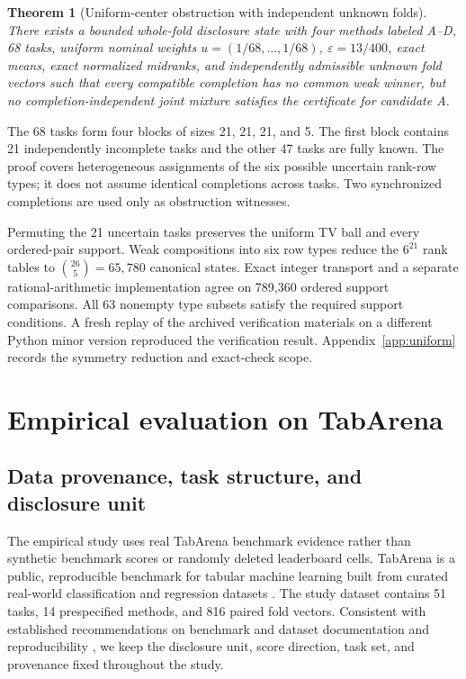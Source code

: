 \documentclass[preprint,11pt]{elsarticle}
\newtheorem{theorem}{Theorem}
\begin{document}
\begin{theorem}[Uniform-center obstruction with independent unknown folds]\label{thm:uniform}
There exists a bounded whole-fold disclosure state with four methods labeled A--D, 68 tasks, uniform nominal weights $u=(1/68,\ldots,1/68)$, $\varepsilon=13/400$, exact means, exact normalized midranks, and independently admissible unknown fold vectors such that every compatible completion has no common weak winner, but no completion-independent joint mixture satisfies the certificate for candidate A.
\end{theorem}

The 68 tasks form four blocks of sizes 21, 21, 21, and 5. The first block contains 21 independently incomplete tasks and the other 47 tasks are fully known. The proof covers heterogeneous assignments of the six possible uncertain rank-row types; it does not assume identical completions across tasks. Two synchronized completions are used only as obstruction witnesses.

Permuting the 21 uncertain tasks preserves the uniform TV ball and every ordered-pair support. Weak compositions into six row types reduce the $6^{21}$ rank tables to $\binom{26}{5}=65{,}780$ canonical states. Exact integer transport and a separate rational-arithmetic implementation agree on 789,360 ordered support comparisons. All 63 nonempty type subsets satisfy the required support conditions. A fresh replay of the archived verification materials on a different Python minor version reproduced the verification result. Appendix~\ref{app:uniform} records the symmetry reduction and exact-check scope.

\section{Empirical evaluation on TabArena}

\subsection{Data provenance, task structure, and disclosure unit}

The empirical study uses real TabArena benchmark evidence rather than synthetic benchmark scores or randomly deleted leaderboard cells. TabArena is a public, reproducible benchmark for tabular machine learning built from curated real-world classification and regression datasets \cite{r12}. The study dataset contains 51 tasks, 14 prespecified methods, and 816 paired fold vectors. Consistent with established recommendations on benchmark and dataset documentation and reproducibility \cite{r16,r17,r18,r25,r26}, we keep the disclosure unit, score direction, task set, and provenance fixed throughout the study.
\end{document}
